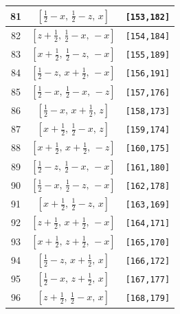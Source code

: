 \documentclass[fleqn,8pt]{jsarticle}
\begin{document}
\begin{longtable}{ccc}
81 & $\left[ \frac{1}{2} - x,\, \frac{1}{2} - z,\, x \right]$ & {\tt [153,182]} \\ \hline
82 & $\left[ z + \frac{1}{2},\, \frac{1}{2} - x,\, - x \right]$ & {\tt [154,184]} \\ \hline
83 & $\left[ x + \frac{1}{2},\, \frac{1}{2} - z,\, - x \right]$ & {\tt [155,189]} \\ \hline
84 & $\left[ \frac{1}{2} - z,\, x + \frac{1}{2},\, - x \right]$ & {\tt [156,191]} \\ \hline
85 & $\left[ \frac{1}{2} - x,\, \frac{1}{2} - x,\, - z \right]$ & {\tt [157,176]} \\ \hline
86 & $\left[ \frac{1}{2} - x,\, x + \frac{1}{2},\, z \right]$ & {\tt [158,173]} \\ \hline
87 & $\left[ x + \frac{1}{2},\, \frac{1}{2} - x,\, z \right]$ & {\tt [159,174]} \\ \hline
88 & $\left[ x + \frac{1}{2},\, x + \frac{1}{2},\, - z \right]$ & {\tt [160,175]} \\ \hline
89 & $\left[ \frac{1}{2} - z,\, \frac{1}{2} - x,\, - x \right]$ & {\tt [161,180]} \\ \hline
90 & $\left[ \frac{1}{2} - x,\, \frac{1}{2} - z,\, - x \right]$ & {\tt [162,178]} \\ \hline
91 & $\left[ x + \frac{1}{2},\, \frac{1}{2} - z,\, x \right]$ & {\tt [163,169]} \\ \hline
92 & $\left[ z + \frac{1}{2},\, x + \frac{1}{2},\, - x \right]$ & {\tt [164,171]} \\ \hline
93 & $\left[ x + \frac{1}{2},\, z + \frac{1}{2},\, - x \right]$ & {\tt [165,170]} \\ \hline
94 & $\left[ \frac{1}{2} - z,\, x + \frac{1}{2},\, x \right]$ & {\tt [166,172]} \\ \hline
95 & $\left[ \frac{1}{2} - x,\, z + \frac{1}{2},\, x \right]$ & {\tt [167,177]} \\ \hline
96 & $\left[ z + \frac{1}{2},\, \frac{1}{2} - x,\, x \right]$ & {\tt [168,179]} \\
\end{longtable}
\renewcommand{\arraystretch}{1.2}
\end{document}
